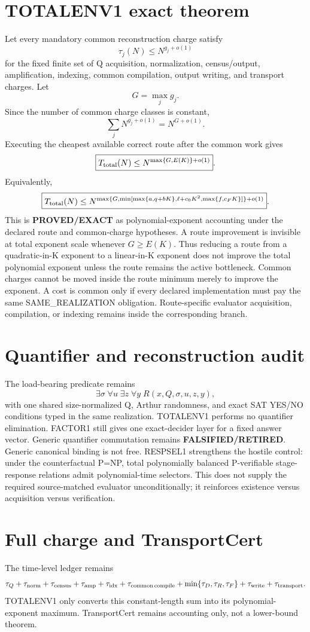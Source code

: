 \documentclass[11pt]{article}
\begin{document}
\section*{TOTALENV1 exact theorem}
Let every mandatory common reconstruction charge satisfy
\[\tau_j(N)\le N^{g_j+o(1)}\]
for the fixed finite set of Q acquisition, normalization, census/output, amplification, indexing, common compilation, output writing, and transport charges. Let
\[G=\max_j g_j.\]
Since the number of common charge classes is constant,
\[\sum_j N^{g_j+o(1)}=N^{G+o(1)}.\]
Executing the cheapest available correct route after the common work gives
\[\boxed{T_{\rm total}(N)\le N^{\max\{G,E(K)\}+o(1)}}.\]
Equivalently,
\[\boxed{T_{\rm total}(N)\le N^{\max\{G,\min[\max\{a,q+bK\},\ell+c_0K^2,\max\{f,c_FK\}]\}+o(1)}}.\]
This is \textbf{PROVED/EXACT} as polynomial-exponent accounting under the declared route and common-charge hypotheses.
A route improvement is invisible at total exponent scale whenever \(G\ge E(K)\). Thus reducing a route from a quadratic-in-K exponent to a linear-in-K exponent does not improve the total polynomial exponent unless the route remains the active bottleneck.
Common charges cannot be moved inside the route minimum merely to improve the exponent. A cost is common only if every declared implementation must pay the same SAME\_REALIZATION obligation. Route-specific evaluator acquisition, compilation, or indexing remains inside the corresponding branch.
\section*{Quantifier and reconstruction audit}
The load-bearing predicate remains
\[\exists\sigma\;\forall u\;\exists z\;\forall y\;R(x,Q,\sigma,u,z,y),\]
with one shared size-normalized Q, Arthur randomness, and exact SAT YES/NO conditions typed in the same realization. TOTALENV1 performs no quantifier elimination. FACTOR1 still gives one exact-decider layer for a fixed answer vector. Generic quantifier commutation remains \textbf{FALSIFIED/RETIRED}. Generic canonical binding is not free.
RESPSEL1 strengthens the hostile control: under the counterfactual P=NP, total polynomially balanced P-verifiable stage-response relations admit polynomial-time selectors. This does not supply the required source-matched evaluator unconditionally; it reinforces existence versus acquisition versus verification.
\section*{Full charge and TransportCert}
The time-level ledger remains
\[\tau_Q+\tau_{\rm norm}+\tau_{\rm census}+\tau_{\rm amp}+\tau_{\rm idx}+\tau_{\rm common\,compile}+\min\{\tau_D,\tau_R,\tau_F\}+\tau_{\rm write}+\tau_{\rm transport}.\]
TOTALENV1 only converts this constant-length sum into its polynomial-exponent maximum. TransportCert remains accounting only, not a lower-bound theorem.
\end{document}

